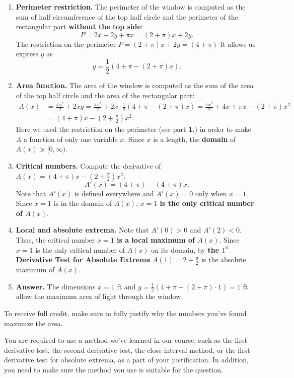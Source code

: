 \documentclass[11pt]{article}
\begin{document}
\begin{enumerate}
{\color{blue}
\begin{enumerate}
\item[\textbf{1.}]
\textbf{Perimeter restriction.}
The perimeter of the window is computed as the sum of half circumference of
the top half circle and the perimeter of the rectangular part
\textbf{without the top side}:
\[
P = 2x + 2y + \pi x = (2+\pi) x  + 2y.
\]
The restriction on the perimeter
$P = (2+\pi) x  + 2y = (4 + \pi) \text{ ft}$
allows us express $y$ as
\[
y = \frac{1}{2}\left(4 + \pi - (2+\pi)x\right).
\]
\item[\textbf{2.}]
\textbf{Area function.}
The area of the window is computed as the sum of the area of the top
half circle and the area of the rectangular part:
\begin{align*}
A(x) &= \frac{\pi x^2}{2} + 2 x y
=
\frac{\pi x^2}{2} + 2 x\cdot \frac{1}{2}\left(4 + \pi - (2+\pi)x\right)
=
\frac{\pi x^2}{2} + 4x + \pi x - (2+\pi)x^2 \\
&= (4 + \pi)x - \left(2+\frac{\pi}{2}\right)x^2.
\end{align*}
Here we used the restriction on the perimeter (see part \textbf{1.})
in order to make $A$ a function of only one variable $x$.
Since $x$ is a length, the \textbf{domain}
of $A(x)$ is $[0,\infty)$.
\item[\textbf{3.}]
\textbf{Critical numbers.}
Compute the derivative of
$A(x)=(4 + \pi)x - \left(2+\frac{\pi}{2}\right)x^2$:
\[
A'(x) = (4 + \pi) - \left(4+\pi\right)x.
\]
Note that $A'(x)$ is defined everywhere and
$A'(x)=0$ only when $x=1$.
Since $x=1$ is in the domain of $A(x)$,
\textbf{$x=1$ is the only critical number of $A(x)$}.
\item[\textbf{4.}]
\textbf{Local and absolute extrema.}
Note that $A'(0) > 0$ and $A'(2) < 0$.
Thus, the critical number \textbf{$x=1$ is a local maximum of $A(x)$}.
Since $x=1$ is the only critical number
of $A(x)$ on its domain,
by
\textbf{the $1^\text{st}$ Derivative Test for
Absolute Extrema}
$A(1)=2+\frac{\pi}{2}$ is the absolute
maximum of $A(x)$.
\item[\textbf{5.}]
\textbf{Answer.}
The dimensions
$x=1$ ft and
$y=\frac{1}{2}\left(4 + \pi - (2+\pi)\cdot1\right)
=1$ ft
allow the maximum area of light through the window.
\end{enumerate}
}
\vfill


To receive full credit, make sure to fully justify why the numbers you've found maximize the area. 

You are required to use a method we've learned in our course, such as the first derivative test, the second derivative test, the close interval method, or the first derivative test for absolute extrema, as a part of your justification. In addition, you need to make sure the method you use is suitable for the question.


\end{enumerate}
\end{document}
